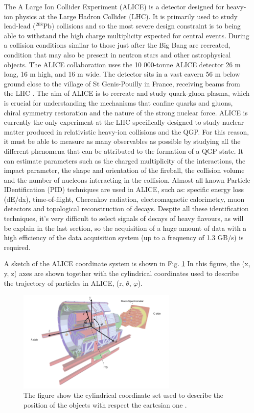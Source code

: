 \documentclass[12pt,a4paper]{book}
\begin{document}
	The A Large Ion Collider Experiment (ALICE) is a detector designed for heavy-ion physics at the Large Hadron Collider (LHC). It is primarily used to study lead-lead ($^{208}\text{Pb}$) collisions and so the most severe design constraint is to being able to withstand the high charge multiplicity expected for central events. During a collision conditions similar to those just after the Big Bang are recreated, condition that may also be present in neutron stars and other astrophysical objects. The ALICE collaboration uses the 10 000-tonne ALICE detector 26 m long, 16 m high, and 16 m wide. The detector sits in a vast cavern 56 m below ground close to the village of St Genis-Pouilly in France, receiving beams from the LHC \cite{Alice}.  The aim of ALICE is to recreate and study quark-gluon plasma, which is crucial for understanding the mechanisms that confine quarks and gluons, chiral symmetry restoration and the nature of the strong nuclear force. ALICE is currently the only experiment at the LHC specifically designed to study nuclear matter produced in relativistic heavy-ion collisions and the QGP. For this reason, it must be able to measure as many observables as possible by studying all the different phenomena that can be attributed to the formation of a QGP state. It can estimate parameters such as the charged multiplicity of the interactions, the impact parameter, the shape and orientation of the fireball, the collision volume and the number of nucleons interacting in the collision. Almost all known Particle IDentification (PID) techniques are used in ALICE, such as: specific energy loss (dE/dx), time-of-flight, Cherenkov radiation, electromagnetic calorimetry, muon detectors and topological reconstruction of decays. 
	Despite all these identification techniques, it's very difficult to select signals of decays of heavy flavours, as will be explain in the last section, so the acquisition of a huge amount of data with a high efficiency of the data acquisition system (up to a frequency of 1.3 GB/s) is required. 
	
	A sketch of the ALICE coordinate system is shown in Fig. \ref{fig:ALICE_cordinates} In this figure, the (x, y, z) axes are shown together with the cylindrical coordinates used to describe the trajectory of particles in ALICE, (r, $\theta$, $\varphi$).
	\begin{figure}[h]
		\centering
		\includegraphics[width=0.7\textwidth]{pictures/ALICE_cordinates.png}
		\caption{The figure show the cylindrical coordinate set used to describe the position of the objects with respect the cartesian one \cite{Herrmann:2920632}.}
		\label{fig:ALICE_cordinates}
	\end{figure}
	
\end{document}

